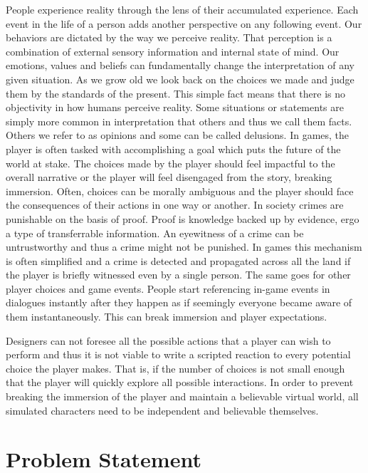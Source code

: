 People experience reality through the lens of their accumulated experience.
Each event in the life of a person adds another perspective on any following event.
Our behaviors are dictated by the way we perceive reality.
That perception is a combination of external sensory information and internal state of mind.
Our emotions, values and beliefs can fundamentally change the interpretation of any given situation.
As we grow old we look back on the choices we made and judge them by the standards of the present.
This simple fact means that there is no objectivity in how humans perceive reality.
Some situations or statements are simply more common in interpretation that others and thus we call them facts.
Others we refer to as opinions and some can be called delusions.
In games, the player is often tasked with accomplishing a goal which puts the future of the world at stake.
The choices made by the player should feel impactful to the overall narrative or the player will feel disengaged from the story, breaking immersion.
Often, choices can be morally ambiguous and the player should face the consequences of their actions in one way or another.
In society crimes are punishable on the basis of proof.
Proof is knowledge backed up by evidence, ergo a type of transferrable information.
An eyewitness of a crime can be untrustworthy and thus a crime might not be punished.
In games this mechanism is often simplified and a crime is detected and propagated across all the land if the player is briefly witnessed even by a single person.
The same goes for other player choices and game events.
People start referencing in-game events in dialogues instantly after they happen as if seemingly everyone became aware of them instantaneously.
This can break immersion and player expectations.

Designers can not foresee all the possible actions that a player can wish to perform and thus it is not viable to write a scripted reaction to every potential choice the player makes.
That is, if the number of choices is not small enough that the player will quickly explore all possible interactions.
In order to prevent breaking the immersion of the player and maintain a believable virtual world, all simulated characters need to be independent and believable themselves.

\section*{Problem Statement}

